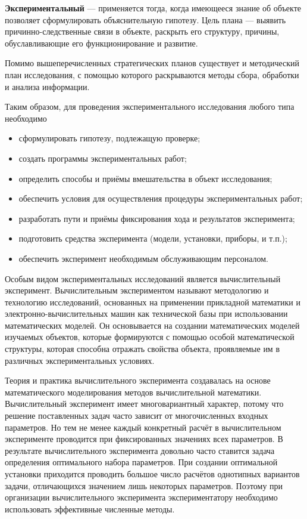 \textbf{Экспериментальный} --- применяется тогда, когда имеющееся знание об
объекте позволяет сформулировать объяснительную гипотезу. Цель плана ---
выявить причинно-следственные связи в объекте, раскрыть его структуру,
причины, обуславливающие его функционирование и развитие. \cite{lit7}

Помимо вышеперечисленных стратегических планов существует и
методический план исследования, с помощью которого раскрываются методы
сбора, обработки и анализа информации. \cite{lit7}

Таким образом, для проведения экспериментального исследования любого типа необходимо
\begin{itemize}[label*=---]
	\item сформулировать гипотезу, подлежащую проверке;
	\item создать программы экспериментальных работ;
	\item определить способы и приёмы вмешательства в объект исследования;
	\item обеспечить условия для осуществления процедуры экспериментальных работ;
	\item разработать пути и приёмы фиксирования хода и результатов эксперимента;
	\item подготовить средства эксперимента (модели, установки, приборы, и т.п.);
	\item обеспечить эксперимент необходимым обслуживающим персоналом.
\end{itemize}




Особым видом экспериментальных исследований является вычислительный эксперимент. Вычислительным экспериментом называют методологию и технологию исследований, основанных на применении прикладной математики и электронно-вычислительных машин как технической базы при использовании математических моделей. Он основывается на создании
математических моделей изучаемых объектов, которые формируются с
помощью особой математической структуры, которая способна отражать свойства объекта, проявляемые им в различных экспериментальных условиях. \cite{lit8}

Теория и практика вычислительного эксперимента создавалась на
основе математического моделирования методов вычислительной математики. Вычислительный эксперимент имеет многовариантный характер,
потому что решение поставленных задач часто зависит от многочисленных входных параметров. Но тем не менее каждый конкретный расчёт в
вычислительном эксперименте проводится при фиксированных значениях всех параметров. В результате вычислительного эксперимента довольно часто ставится задача определения оптимального набора параметров. При создании оптимальной установки приходится проводить
большое число расчётов однотипных вариантов задачи, отличающихся
значением лишь некоторых параметров. Поэтому при организации вычислительного эксперимента экспериментатору необходимо использовать эффективные численные методы. \cite{lit8}

